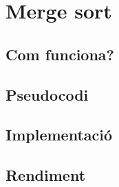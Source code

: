 \chapter{Merge sort}

\section{Com funciona?}
\section{Pseudocodi}
\section{Implementació}

\section{Rendiment}
